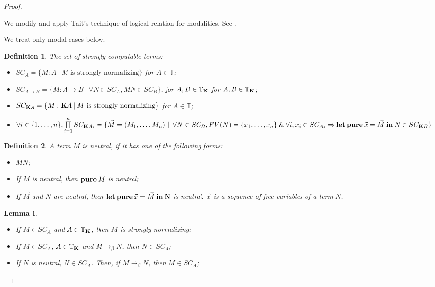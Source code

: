 \documentclass[a4paper]{article}
\newtheorem{lemma}{Lemma}
\newtheorem{defin}{Definition}
\begin{document}
\begin{proof}
  $ $

We modify and apply Tait's technique of logical relation for modalities. See \cite{Pierce} \cite{Troelstra}.

We treat only modal cases below.

\begin{defin} The set of strongly computable terms:
  \begin{itemize}
    \item $SC_A = \{ M : A \: | \: M \text{ is strongly normalizing} \}$ for $A \in \mathbb{T}$;
    \item $SC_{A \to B} = \{ M : A \to B \: | \: \forall N \in SC_A, M N \in SC_B \}$, for $A,B \in \mathbb{T}_{\bf K}$ for $A, B \in \mathbb{T}_{{\bf K}}$;
    \item $SC_{{\bf K}A} = \{ M : {\bf K}A \: | \: M \text{ is strongly normalizing} \}$ for $A \in \mathbb{T}$;
    \item $\forall i \in \{ 1,\dots,n\}, \prod \limits_{i = 1}^{n} SC_{{\bf K}A_i} = \{ \vec{M} = (M_1,\dots,M_n) \:\: | \:\: \forall N \in SC_{B}, FV(N) = \{ x_1,\dots,x_n\} \: \& \: \forall i, x_i \in SC_{A_i} \Rightarrow {\bf let \: pure \:} \vec{x} = \vec{M} {\: \bf in \:} N \in SC_{{\bf K} B}\}$
  \end{itemize}
\end{defin}

\begin{defin}
  A term $M$ is neutral, if it has one of the following forms:
  \begin{itemize}
    \item $M N$;
    \item If $M$ is neutral, then ${\bf pure \:} M$ is neutral;
    \item If $\vec{M}$ and $N$ are neutral, then ${\bf let \: pure \:} \vec{x} = \vec{M} {\: \bf in \: N}$ is neutral.
    $\vec{x}$ is a sequence of free variables of a term $N$.
  \end{itemize}
\end{defin}

\begin{lemma}
  $ $

\begin{itemize}
\item If $M \in SC_A$ and $A \in \mathbb{T}_{{\bf K}}$, then $M$ is strongly normalizing;
\item If $M \in SC_A$, $A \in \mathbb{T}_{{\bf K}}$ and $M \rightarrow_{\beta} N$, then $N \in SC_A$;
\item If $N$ is neutral, $N \in SC_A$. Then, if $M \rightarrow_{\beta} N$, then $M \in SC_A$;
\end{itemize}
\end{lemma}


\end{proof}
\end{document}

